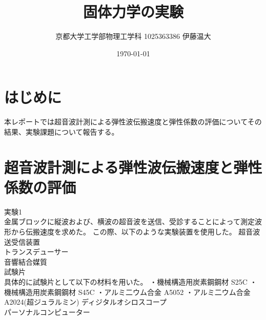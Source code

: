 \documentclass[uplatex,dvipdfmx,titlepage]{jsarticle}
\title{固体力学の実験}
\author{京都大学工学部物理工学科 1025363386 伊藤温大}
\date{\today}
\begin{document}
\maketitle

\tableofcontents
\clearpage

\section{はじめに}
本レポートでは超音波計測による弾性波伝搬速度と弾性係数の評価についてその結果、実験課題について報告する。


\section{超音波計測による弾性波伝搬速度と弾性係数の評価}
実験1\\
金属ブロックに縦波および、横波の超音波を送信、受診することによって測定波形から伝搬速度を求めた。
この際、以下のような実験装置を使用した。
超音波送受信装置\\
トランスデューサー\\
音響結合媒質\\
試験片\\
具体的に試験片として以下の材料を用いた。
・機械構造用炭素鋼鋼材 S25C
・機械構造用炭素鋼鋼材 S45C
・アルミ二ウム合金     A5052
・アルミ二ウム合金     A2024(超ジュラルミン)
ディジタルオシロスコープ\\
パーソナルコンピューター\\
\end{document}
